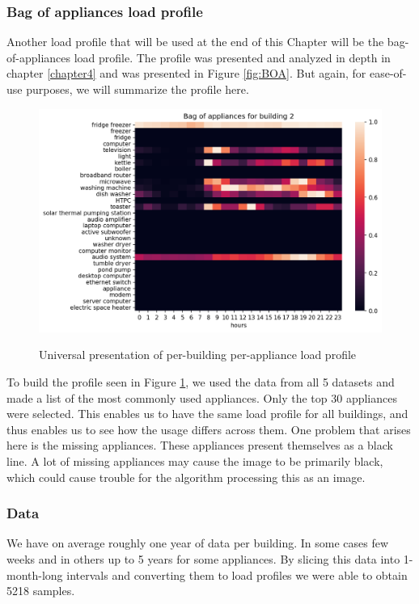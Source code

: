 \subsubsection{Bag of appliances load profile}

Another load profile that will be used at the end of this Chapter will be the bag-of-appliances load profile.
The profile was presented and analyzed in depth in chapter \ref{chapter4} and was presented in Figure \ref{fig:BOA}.
But again, for ease-of-use purposes, we will summarize the profile here.

\begin{figure}[H]
	\centering
	\caption{Universal presentation of per-building per-appliance load profile}
	\includegraphics[width=1\textwidth]{../Figures/LPS/BOA.png}
	\label{fig:BOA2}
\end{figure}

To build the profile seen in Figure \ref{fig:BOA2}, we used the data from all 5 datasets and made a list of the most commonly used appliances.
Only the top 30 appliances were selected.
This enables us to have the same load profile for all buildings, and thus enables us to see how the usage differs across them.
One problem that arises here is the missing appliances.
These appliances present themselves as a black line.
A lot of missing appliances may cause the image to be primarily black,
which could cause trouble for the algorithm processing this as an image.

\subsubsection{Data}

We have on average roughly one year of data per building. 
In some cases few weeks and in others up to 5 years for some appliances.
By slicing this data into 1-month-long intervals and converting them to load profiles we were able to obtain 5218 samples.

